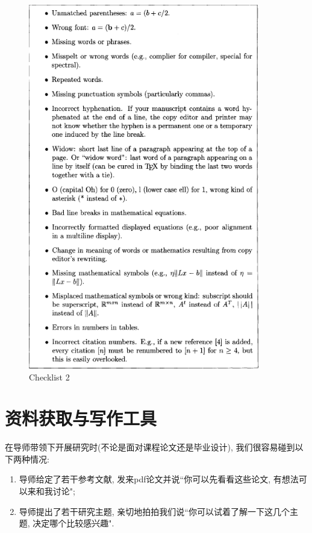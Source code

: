 \documentclass{formatBook}
\begin{document}
\begin{figure}[htb]
    \centering
    \includegraphics[width=0.9\textwidth]{figure/Figure 8.2.png}
    \caption{Checklist 2}
    \label{fig:my_label}
\end{figure}
\chapter{资料获取与写作工具}
在导师带领下开展研究时(不论是面对课程论文还是毕业设计), 我们很容易碰到以下两种情况:
\begin{enumerate}
    \item 导师给定了若干参考文献, 发来pdf论文并说``你可以先看看这些论文, 有想法可以来和我讨论";
    \item 导师提出了若干研究主题, 亲切地拍拍我们说``你可以试着了解一下这几个主题, 决定哪个比较感兴趣".
\end{enumerate}
\end{document}
